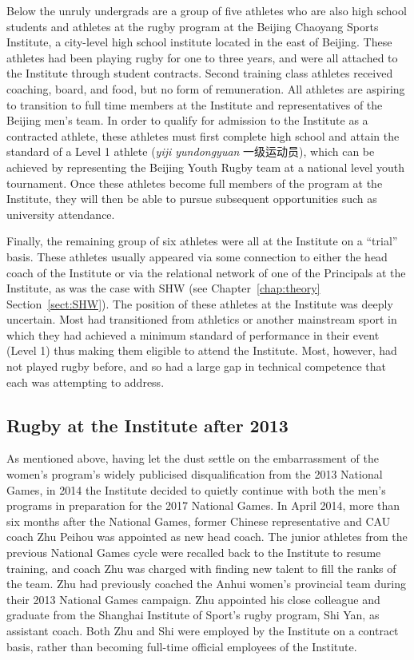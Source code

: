 \begin{CJK}{UTF8}{gbsn}
Below the unruly undergrads are a group of five athletes who are also high school students and athletes at the rugby program at the Beijing Chaoyang Sports Institute, a city-level high school institute located in the east of Beijing.  These athletes had been playing rugby for one to three years, and were all attached to the Institute through student contracts.  Second training class athletes received coaching, board, and food, but no form of remuneration.  All athletes are aspiring to transition to full time members at the Institute and representatives of the Beijing men's team.  In order to qualify for admission to the Institute as a contracted athlete, these athletes must first complete high school and attain the standard of a Level 1 athlete (\textit{yiji yundongyuan} 一级运动员), which can be achieved by representing the Beijing Youth Rugby team at a national level youth tournament.  Once these athletes become full members of the program at the Institute, they will then be able to pursue subsequent opportunities such as university attendance.

Finally, the remaining group of six athletes were all at the Institute on a ``trial'' basis.  These athletes usually appeared via some connection to either the head coach of the Institute or via the relational network of one of the Principals at the Institute, as was the case with SHW (see Chapter~\ref{chap:theory} Section~\ref{sect:SHW}). The position of these athletes at the Institute was deeply uncertain.  Most had transitioned from athletics or another mainstream sport in which they had achieved a minimum standard of performance in their event (Level 1) thus making them eligible to attend the Institute.  Most, however, had not played rugby before, and so had a large gap in technical competence that each was attempting to address.



\subsection{Rugby at the Institute after 2013}
As mentioned above, having let the dust settle on the embarrassment of the women's program's widely publicised disqualification from the 2013 National Games, in 2014 the Institute decided to quietly continue with both the men's programs in preparation for the 2017 National Games.  In April 2014, more than six months after the National Games, former Chinese representative and CAU coach Zhu Peihou was appointed as new head coach.  The junior athletes from the previous National Games cycle were recalled back to the Institute to resume training, and coach Zhu was charged with finding new talent to fill the ranks of the team.  Zhu had previously coached the Anhui women's provincial team during their 2013 National Games campaign.  Zhu appointed his close colleague and graduate from the Shanghai Institute of Sport's rugby program, Shi Yan, as assistant coach.  Both Zhu and Shi were employed by the Institute on a contract basis, rather than becoming full-time official employees of the Institute.


\end{CJK}

